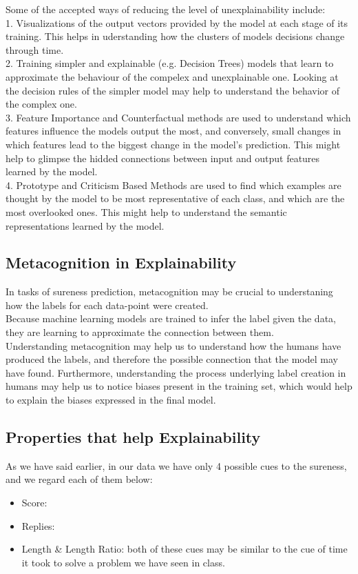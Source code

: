 \documentclass[11pt, oneside]{article}   	%
\begin{document}
Some of the accepted ways of reducing the level of unexplainability include:\\
1. Visualizations of the output vectors provided by the model at each stage of its training. This helps in uderstanding how the clusters of models decisions change through time.\\
2. Training simpler and explainable (e.g. Decision Trees) models that learn to approximate the behaviour of the compelex and unexplainable one. Looking at the decision rules of the simpler model may help to understand the behavior of the complex one.\\
3. Feature Importance and Counterfactual methods are used to understand which features influence the models output the most, and conversely, small changes in which features lead to the biggest change in the model's prediction. This might help to glimpse the hidded connections between input and output features learned by the model.\\
4. Prototype and Criticism Based Methods are used to find which examples are thought by the model to be most representative of each class, and which are the most overlooked ones. This might help to understand the semantic representations learned by the model.

\subsection{Metacognition in Explainability}
In tasks of sureness prediction, metacognition may be crucial to understaning how the labels for each data-point were created.\\

Because machine learning models are trained to infer the label given the data, they are learning to approximate the connection between them.\\
Understanding metacognition may help us to understand how the humans have produced the labels, and therefore the possible connection that the model may have found. Furthermore, understanding the process underlying label creation in humans may help us to notice biases present in the training set, which would help to explain the biases expressed in the final model.

\subsection{Properties that help Explainability}
As we have said earlier, in our data we have only 4 possible cues to the sureness, and we regard each of them below:
\begin{itemize}
    \item Score:
    \item Replies:
    \item Length \& Length Ratio: both of these cues may be similar to the cue of time it took to solve a problem we have seen in class. 
\end{itemize}
\end{document}
